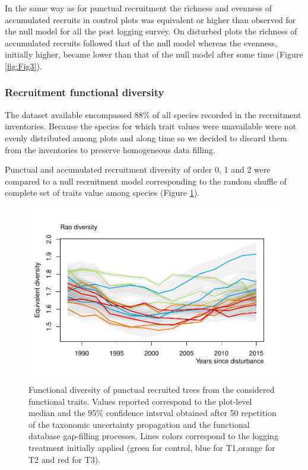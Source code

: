 \documentclass[fleqn,10pt]{ArtEcoFoG} %
\begin{document}
In the same way as for punctual recruitment the richness and evenness of
accumulated recruits in control plots was equivalent or higher than
observed for the null model for all the post logging survey. On
disturbed plots the richness of accumulated recruits followed that of
the null model whereas the evenness, initially higher, became lower than
that of the null model after some time (Figure \ref{fig:Fig3}).

\subsubsection{Recruitment functional
diversity}\label{recruitment-functional-diversity}

The dataset available encompassed 88\% of all species recorded in the
recruitment inventories. Because the species for which trait values were
unavailable were not evenly distributed among plots and along time so we
decided to discard them from the inventories to preserve homogeneous
data filling.

Punctual and accumulated recruitment diversity of order 0, 1 and 2 were
compared to a null recruitment model corresponding to the random shuffle
of complete set of traits value among species (Figure \ref{fig:Fig4}).

\begin{figure}

{\centering \includegraphics{RecruitmentTrajectories_files/figure-latex/Fig4-1} 

}

\caption{Functional diversity of punctual recruited trees from the considered functional traits. Values reported correspond to the plot-level median and the 95\% confidence interval obtained after 50 repetition of the taxonomic uncertainty propagation and the functional database gap-filling processes. Lines colors correspond to the logging treatment initially applied (green for control, blue for T1,orange for T2 and red for T3).}\label{fig:Fig4}
\end{figure}
\end{document}
